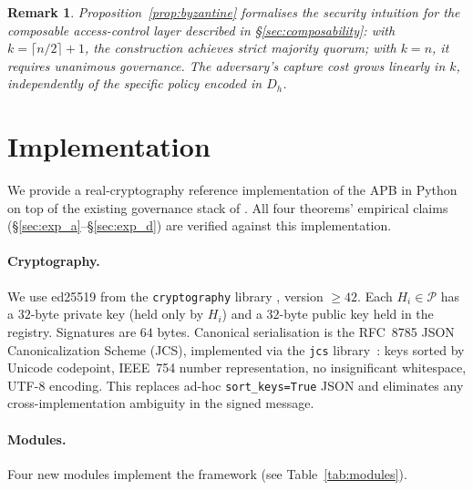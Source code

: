 \documentclass[11pt]{article}
\newtheorem{remark}{Remark}[section]
\newcommand{\Pset}{\mathcal{P}}
\newcommand{\Dh}{D_h}
\newcommand{\Hi}{H_i}
\begin{document}
\begin{remark}
Proposition~\ref{prop:byzantine} formalises the security intuition
for the composable access-control layer described in
\S\ref{sec:composability}: with $k = \lceil n/2 \rceil + 1$, the
construction achieves strict majority quorum; with $k = n$, it
requires unanimous governance. The adversary's capture cost grows
linearly in $k$, independently of the specific policy encoded in
$\Dh$.
\end{remark}

\section{Implementation}
\label{sec:impl}

We provide a real-cryptography reference implementation of the APB
in Python on top of the existing governance stack of
\citep{fernandez2026applied}. All four theorems' empirical claims
(\S\ref{sec:exp_a}--\S\ref{sec:exp_d}) are verified against this
implementation.

\paragraph{Cryptography.}
We use ed25519 from the \texttt{cryptography} library
\citep{cryptographylib}, version $\geq 42$. Each $\Hi \in \Pset$ has a
$32$-byte private key (held only by $\Hi$) and a $32$-byte public key
held in the registry. Signatures are $64$ bytes. Canonical
serialisation is the RFC~8785 JSON Canonicalization Scheme (JCS),
implemented via the \texttt{jcs} library~\citep{rfc8785}: keys sorted
by Unicode codepoint, IEEE~754 number representation, no insignificant
whitespace, UTF-8 encoding. This replaces ad-hoc
\texttt{sort\_keys=True} JSON and eliminates any cross-implementation
ambiguity in the signed message.

\paragraph{Modules.}
Four new modules implement the framework
(see Table~\ref{tab:modules}).
\end{document}
